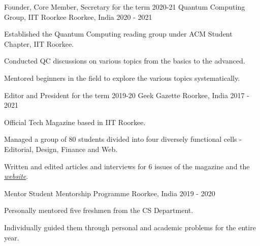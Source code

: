 

\begin{cventries}
  \cventry
    {Founder, Core Member, Secretary for the term 2020-21} %
    {Quantum Computing Group, IIT Roorkee} %
    {Roorkee, India} %
    {2020 - 2021} %
    {
      \begin{cvitems} %
        \item {Established the Quantum Computing reading group under ACM Student Chapter, IIT Roorkee.}
        \item {Conducted QC discussions on various topics from the basics to the advanced.}
        \item {Mentored beginners in the field to explore the various topics systematically.}
    \end{cvitems}
    }

  \cventry
    {Editor and President for the term 2019-20} %
    {Geek Gazette} %
    {Roorkee, India} %
    {2017 - 2021} %
    {
      \begin{cvitems} %
        \item {Official Tech Magazine based in IIT Roorkee.}
        \item {Managed a group of 80 students divided into four diversely functional cells - Editorial, Design, Finance and Web.}
        \item {Written and edited articles and interviews for 6 issues of the magazine and the \emph{\href{https://geekgazette.iitr.ac.in}{website}}.}
      \end{cvitems}
    }

  \cventry
    {Mentor} %
    {Student Mentorship Programme} %
    {Roorkee, India} %
    {2019 - 2020} %
    {
      \begin{cvitems} %
        \item {Personally mentored five freshmen from the CS Department.}
        \item {Individually guided them through personal and academic problems for the entire year.}
      \end{cvitems}
    }


\end{cventries}

